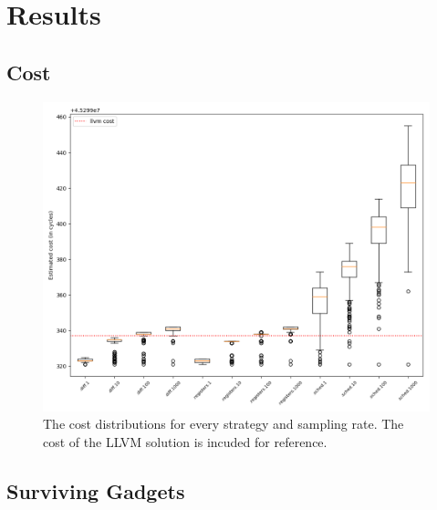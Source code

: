 \chapter{Results}

\section{Cost}



\begin{figure}[h]
	\centering
	\includegraphics[width=\textwidth]{results/figures/cost}
	\caption{The cost distributions for every strategy and sampling rate. The cost of the LLVM solution is incuded for reference.}
	\label{fig:cost}
\end{figure}


\section{Surviving Gadgets}

